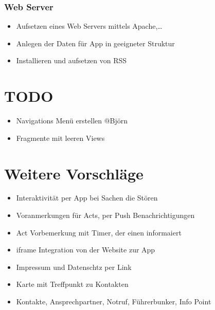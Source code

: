 \documentclass[a4paper,12pt,
headsepline,           %
oneside,               %
pointlessnumbers,      %
bibtotoc,              %
BCOR15mm               %
]{scrbook}
\begin{document}
  \subsubsection*{Web Server}
  \begin{itemize}
      \item Aufsetzen eines Web Servers mittels Apache,\dots
      \item Anlegen der Daten für App in geeigneter Struktur
      \item Installieren und aufsetzen von RSS
  \end{itemize}

  \section*{TODO}
  \begin{itemize}
    \item Navigations Menü erstellen @Björn
    \item Fragmente mit leeren Views
  \end{itemize}

  \section*{Weitere Vorschläge}
  \begin{itemize}
    \item Interaktivität per App bei Sachen die Stören
    \item Voranmerkungen für Acts, per Push Benachrichtigungen
    \item Act Vorbemerkung mit Timer, der einen informaiert
    \item iframe Integration von der Website zur App
    \item Impressum und Datenschtz per Link
    \item Karte mit Treffpunkt zu Kontakten
    \item Kontakte, Ansprechpartner, Notruf, Führerbunker, Info Point
  \end{itemize}
\end{document}
